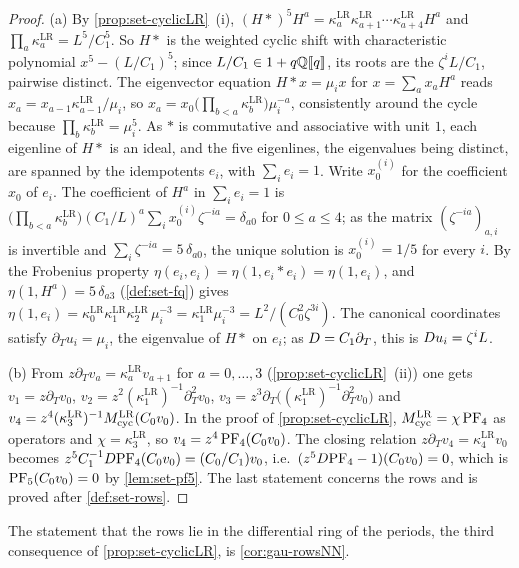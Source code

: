 \begin{proof}
(a) By \cref{prop:set-cyclicLR}~(i), $(H*)^5H^a=\kappa^{\mathrm{LR}}_a\kappa^{\mathrm{LR}}_{a+1}\cdots\kappa^{\mathrm{LR}}_{a+4}H^a$ and $\prod_a\kappa^{\mathrm{LR}}_a=L^5/C_1^5$. So $H*$ is the weighted cyclic shift with characteristic polynomial $x^5-(L/C_1)^5$; since $L/C_1\in1+q\mathbb{Q}[\![ q ]\!]$, its roots are the $\zeta^iL/C_1$, pairwise distinct. The eigenvector equation $H*x=\mu_ix$ for $x=\sum_ax_aH^a$ reads $x_a=x_{a-1}\kappa^{\mathrm{LR}}_{a-1}/\mu_i$, so $x_a=x_0\bigl(\prod_{b<a}\kappa^{\mathrm{LR}}_b\bigr)\mu_i^{-a}$, consistently around the cycle because $\prod_b\kappa^{\mathrm{LR}}_b=\mu_i^5$. As $*$ is commutative and associative with unit $1$, each eigenline of $H*$ is an ideal, and the five eigenlines, the eigenvalues being distinct, are spanned by the idempotents $e_i$, with $\sum_ie_i=1$. Write $x_0^{(i)}$ for the coefficient $x_0$ of $e_i$. The coefficient of $H^a$ in $\sum_ie_i=1$ is $\bigl(\prod_{b<a}\kappa^{\mathrm{LR}}_b\bigr)(C_1/L)^a\sum_ix_0^{(i)}\zeta^{-ia}=\delta_{a0}$ for $0\leq a\leq4$; as the matrix $(\zeta^{-ia})_{a,i}$ is invertible and $\sum_i\zeta^{-ia}=5\,\delta_{a0}$, the unique solution is $x_0^{(i)}=1/5$ for every $i$. By the Frobenius property $\eta(e_i,e_i)=\eta(1,e_i*e_i)=\eta(1,e_i)$, and $\eta(1,H^a)=5\,\delta_{a3}$ (\cref{def:set-fq}) gives $\eta(1,e_i)=\kappa^{\mathrm{LR}}_0\kappa^{\mathrm{LR}}_1\kappa^{\mathrm{LR}}_2\,\mu_i^{-3}=\kappa^{\mathrm{LR}}_1\mu_i^{-3}=L^2/(C_0^2\zeta^{3i})$. The canonical coordinates satisfy $\partial_Tu_i=\mu_i$, the eigenvalue of $H*$ on $e_i$; as $D=C_1\partial_T$, this is $D u_i=\zeta^iL$.

(b) From $z\partial_Tv_a=\kappa^{\mathrm{LR}}_av_{a+1}$ for $a=0,\dots,3$ (\cref{prop:set-cyclicLR}~(ii)) one gets $v_1=z\partial_Tv_0$, $v_2=z^2(\kappa^{\mathrm{LR}}_1)^{-1}\partial_T^2v_0$, $v_3=z^3\partial_T\bigl((\kappa^{\mathrm{LR}}_1)^{-1}\partial_T^2v_0\bigr)$ and $v_4=z^4(\kappa^{\mathrm{LR}}_3)^{-1}M_{\mathrm{cyc}}^{\mathrm{LR}}(C_0v_0)$. In the proof of \cref{prop:set-cyclicLR}, $M_{\mathrm{cyc}}^{\mathrm{LR}}=\chi\,\mathrm{PF}_{4}$ as operators and $\chi=\kappa^{\mathrm{LR}}_3$, so $v_4=z^4\,\mathrm{PF}_{4}(C_0v_0)$. The closing relation $z\partial_Tv_4=\kappa^{\mathrm{LR}}_4v_0$ becomes $z^5C_1^{-1}D\mathrm{PF}_{4}(C_0v_0)=(C_0/C_1)v_0$, i.e.\ $(z^5D\mathrm{PF}_{4}-1)(C_0v_0)=0$, which is $\mathrm{PF}_{5}(C_0v_0)=0$ by \cref{lem:set-pf5}. The last statement concerns the rows and is proved after \cref{def:set-rows}.
\end{proof}

The statement that the rows lie in the differential ring of the periods, the third consequence of \cref{prop:set-cyclicLR}, is \cref{cor:gau-rowsNN}.

